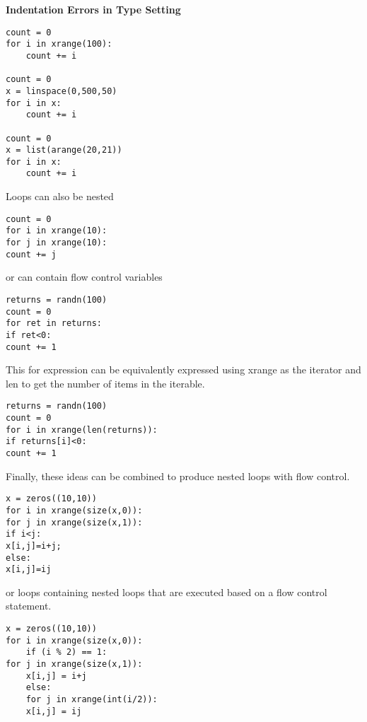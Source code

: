 \documentclass[Pydata.tex]{subfiles}
\begin{document}
\textbf{Indentation Errors in Type Setting}
\begin{framed}
\begin{verbatim}
count = 0
for i in xrange(100):
	count += i

count = 0
x = linspace(0,500,50)
for i in x:
	count += i

count = 0
x = list(arange(20,21))
for i in x:
	count += i
\end{verbatim}
\end{framed}
Loops can also be nested
\begin{framed}
	\begin{verbatim}
count = 0
for i in xrange(10):
for j in xrange(10):
count += j
\end{verbatim}
\end{framed}
or can contain flow control variables
\begin{framed}
	\begin{verbatim}
returns = randn(100)
count = 0
for ret in returns:
if ret<0:
count += 1
\end{verbatim}
\end{framed}
This for expression can be equivalently expressed using xrange as the iterator and len to get the number
of items in the iterable.
\begin{framed}
	\begin{verbatim}
returns = randn(100)
count = 0
for i in xrange(len(returns)):
if returns[i]<0:
count += 1
\end{verbatim}
\end{framed}
Finally, these ideas can be combined to produce nested loops with flow control.
\begin{framed}
	\begin{verbatim}
x = zeros((10,10))
for i in xrange(size(x,0)):
for j in xrange(size(x,1)):
if i<j:
x[i,j]=i+j;
else:
x[i,j]=ij
\end{verbatim}
\end{framed}
or loops containing nested loops that are executed based on a flow control statement.
\begin{framed}
	\begin{verbatim}
x = zeros((10,10))
for i in xrange(size(x,0)):
	if (i % 2) == 1:
for j in xrange(size(x,1)):
	x[i,j] = i+j
	else:
	for j in xrange(int(i/2)):
	x[i,j] = ij
\end{verbatim}
\end{framed}
\end{document}
